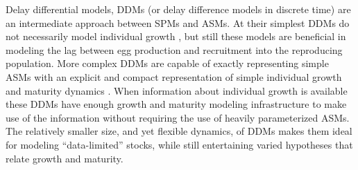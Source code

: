 %
Delay differential models, DDMs (or delay difference models in discrete time) 
are an intermediate approach between SPMs and ASMs. At their simplest DDMs do 
not necessarily model individual growth \cite{dick_depletion-based_2011, aalto_separating_2015}, 
but still these models are beneficial in modeling the lag between egg production 
and recruitment into the reproducing population.  %
More complex DDMs are capable of exactly representing simple ASMs with an 
explicit and compact representation of simple individual growth and maturity 
dynamics \cite{deriso_harvesting_1980, fournier_length-based_1987, schnute_general_1985, schnute_general_1987}.
When information about individual growth is available these DDMs have enough 
growth and maturity modeling infrastructure to make use of the information 
without requiring the use of heavily parameterized ASMs. %
The relatively smaller size, and yet flexible dynamics, of DDMs makes them ideal for 
modeling ``data-limited'' stocks, while still entertaining varied hypotheses that 
relate growth and maturity.  



